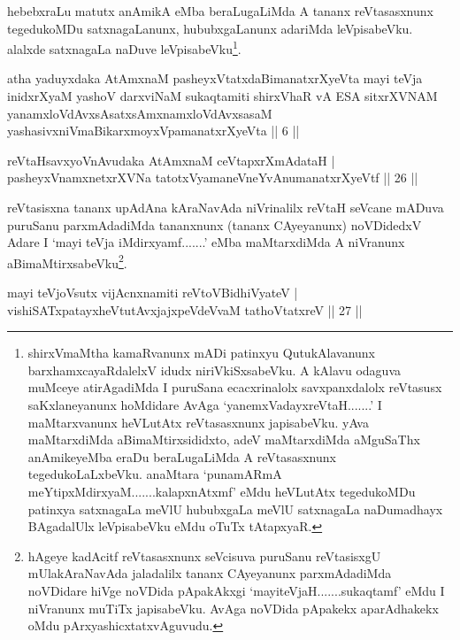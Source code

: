 \begin{artha}
hebebxraLu matutx anAmikA eMba beraLugaLiMda A tananx reVtasasxnunx 
tegedukoMDu satxnagaLanunx, hububxgaLanunx adariMda leVpisabeVku. 
alalxde satxnagaLa naDuve leVpisabeVku\footnote{shirxVmaMtha 
kamaRvanunx mADi patinxyu QutukAlavanunx barxhamxcayaRdalelxV idudx 
niriVkiSxsabeVku. A kAlavu odaguva muMceye atirAgadiMda I puruSana 
ecacxrinalolx savxpanxdalolx reVtasusx saKxlaneyanunx hoMdidare AvAga 
`yanemxVadayxreVtaH.......' I maMtarxvanunx heVLutAtx reVtasasxnunx 
japisabeVku. yAva maMtarxdiMda aBimaMtirxsididxto, adeV maMtarxdiMda 
aMguSaThx anAmikeyeMba eraDu beraLugaLiMda A reVtasasxnunx 
tegedukoLaLxbeVku. anaMtara `punamARmA meYtipxMdirxyaM.......kalapxnAtxmf' eMdu heVLutAtx tegedukoMDu 
patinxya satxnagaLa meVlU hububxgaLa meVlU satxnagaLa naDumadhayx 
BAgadalUlx leVpisabeVku eMdu oTuTx tAtapxyaR.}.
\end{artha}

\begin{kandikeshl}
atha yaduyxdaka AtAmxnaM pasheyxVtatxdaBimanatxrXyeVta mayi teVja inidxrXyaM yashoV darxviNaM sukaqtamiti shirxVhaR vA ESA sitxrXVNAM yanamxloVdAvxsAsatxsAmxnamxloVdAvxsasaM yashasivxniVmaBikarxmoyxVpamanatxrXyeVta || 6 ||
\end{kandikeshl}

\begin{shl}
reVtaHsavxyoVnAvudaka AtAmxnaM ceVtapxrXmAdataH | \\
pasheyxVnamxnetxrXVNa tatotxVyamaneVneYvAnumanatxrXyeVtf \hfill|| 26 || 
\end{shl}

\begin{artha}
reVtasisxna tananx upAdAna kAraNavAda niVrinalilx reVtaH seVcane 
mADuva puruSanu parxmAdadiMda tananxnunx (tananx CAyeyanunx) noVDidedxV 
Adare I `mayi teVja iMdirxyamf.......' eMba maMtarxdiMda A niVranunx 
aBimaMtirxsabeVku\footnote{hAgeye kadAcitf reVtasasxnunx seVcisuva 
puruSanu reVtasisxgU mUlakAraNavAda jaladalilx tananx CAyeyanunx 
parxmAdadiMda noVDidare hiVge noVDida pApakAkxgi `mayiteVjaH.......sukaqtamf' eMdu I 
niVranunx muTiTx japisabeVku. AvAga noVDida pApakekx aparAdhakekx oMdu 
pArxyashicxtatxvAguvudu.}.
\end{artha}


\begin{shl}
mayi teVjoV\s sutx vijAcnxnamiti reVtoV\s BidhiVyateV | \\
vishiSATxpatayxheVtutAvxjajxpeVdeVvaM tathoVtatxreV \hfill|| 27 || 
\end{shl}

